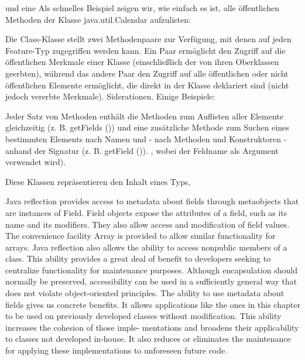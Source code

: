  und eine
Als schnelles Beispiel zeigen wir, wie einfach es ist, alle öffentlichen Methoden der Klasse java.util.Calendar aufzulisten:

Die Class-Klasse stellt zwei Methodenpaare zur Verfügung, mit denen auf jeden Feature-Typ zugegriffen werden kann. Ein Paar ermöglicht den Zugriff auf die öffentlichen Merkmale einer Klasse (einschließlich der von ihren Oberklassen geerbten), während das andere Paar den Zugriff auf alle öffentlichen oder nicht öffentlichen Elemente ermöglicht, die direkt in der Klasse deklariert sind (nicht jedoch vererbte Merkmale). Siderationen. Einige Beispiele:

Jeder Satz von Methoden enthält die Methoden zum Auflisten aller Elemente gleichzeitig (z. B. getFields ()) und eine zusätzliche Methode zum Suchen eines bestimmten Elements nach Namen und - nach Methoden und Konstruktoren - anhand der Signatur (z. B. getField ()). , wobei der Feldname als Argument verwendet wird).





Diese Klassen repräsentieren den Inhalt eines Typs, 




 Java reflection provides access to metadata about fields through metaobjects that are instances of Field. Field objects expose the attributes of a field, such as its name and its modifiers. They also allow access and modification of field values. The convenience facility Array is provided to allow similar functionality for arrays.
Java reflection also allows the ability to access nonpublic members of a class. This ability provides a great deal of benefit to developers seeking to centralize functionality for maintenance purposes. Although encapsulation should normally be preserved, accessibility can be used in a sufficiently general way that does not violate object-oriented principles.
The ability to use metadata about fields gives us concrete benefits. It allows applications like the ones in this chapter to be used on previously developed classes without modification. This ability increases the cohesion of those imple- mentations and broadens their applicability to classes not developed in-house. It also reduces or eliminates the maintenance for applying these implementations to unforeseen future code.


